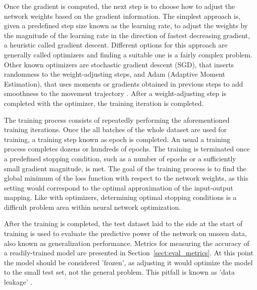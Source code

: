 \documentclass{article}
\begin{document}
Once the gradient is computed, the next step is to choose how to adjust the network weights 
based on the gradient information. The simplest approach is, given a predefined step size 
known as the learning rate, to adjust the weights by the magnitude of the learning rate 
in the direction of fastest decreasing gradient, a heuristic called gradient descent. Different options for this approach 
are generally called optimizers and finding a suitable one is a fairly complex problem.
Other known optimizers are stochastic gradient descent (SGD), that inserts randomness 
to the weight-adjusting steps, and Adam (Adaptive Moment Estimation), that 
uses moments or gradients obtained in previous steps to add smoothness to the 
movement trajectory \cite{princebook}. After a weight-adjusting step is completed 
with the optimizer, the training iteration is completed.

The training process consists of repeatedly performing the aforementioned training 
iterations. Once the all batches of the whole dataset are used for training,
a training step known as epoch is completed. An usual a training process 
completes dozens or hundreds of epochs. The training is terminated once a predefined 
stopping condition, such as a number of epochs or a sufficiently small gradient 
magnitude, is met. The goal of the training process is to find the global minimum of the loss 
function with respect to the network weights, as this setting would correspond to 
the optimal approximation of the input-output mapping. Like with optimizers, 
determining optimal stopping conditions is a difficult problem area within neural network optimization.

After the training is completed, the test dataset laid to the side at the start of 
training is used to evaluate the predictive power of the network on unseen data, 
also known as generalization performance. Metrics for measuring the accuracy 
of a readily-trained model are presented in Section~\ref{sect:eval_metrics}.
At this point the model should be considered 'frozen', as adjusting it would 
optimize the model to the small test set, not the general problem. This pitfall is 
known as 'data leakage' \cite{engbook}.
\end{document}
